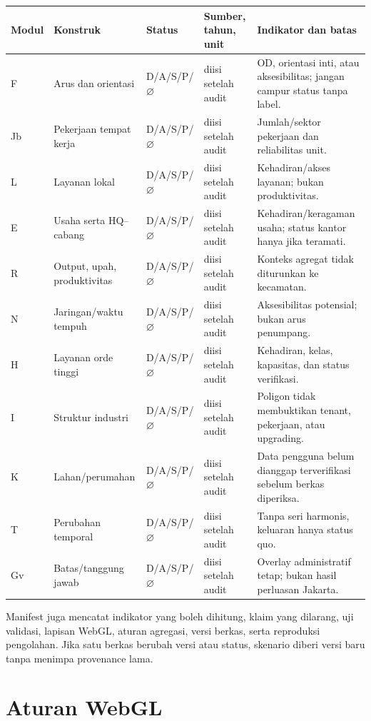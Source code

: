 \documentclass[10pt]{article}
\begin{document}
\begin{longtable}{@{}P{0.09\textwidth}P{0.18\textwidth}P{0.12\textwidth}P{0.18\textwidth}P{0.29\textwidth}@{}}
\toprule
Modul & Konstruk & Status & Sumber, tahun, unit & Indikator dan batas \\
\midrule
F & Arus dan orientasi & D/A/S/P/$\varnothing$ & diisi setelah audit & OD, orientasi inti, atau aksesibilitas; jangan campur status tanpa label. \\
Jb & Pekerjaan tempat kerja & D/A/S/P/$\varnothing$ & diisi setelah audit & Jumlah/sektor pekerjaan dan reliabilitas unit. \\
L & Layanan lokal & D/A/S/P/$\varnothing$ & diisi setelah audit & Kehadiran/akses layanan; bukan produktivitas. \\
E & Usaha serta HQ--cabang & D/A/S/P/$\varnothing$ & diisi setelah audit & Kehadiran/keragaman usaha; status kantor hanya jika teramati. \\
R & Output, upah, produktivitas & D/A/S/P/$\varnothing$ & diisi setelah audit & Konteks agregat tidak diturunkan ke kecamatan. \\
N & Jaringan/waktu tempuh & D/A/S/P/$\varnothing$ & diisi setelah audit & Aksesibilitas potensial; bukan arus penumpang. \\
H & Layanan orde tinggi & D/A/S/P/$\varnothing$ & diisi setelah audit & Kehadiran, kelas, kapasitas, dan status verifikasi. \\
I & Struktur industri & D/A/S/P/$\varnothing$ & diisi setelah audit & Poligon tidak membuktikan tenant, pekerjaan, atau upgrading. \\
K & Lahan/perumahan & D/A/S/P/$\varnothing$ & diisi setelah audit & Data pengguna belum dianggap terverifikasi sebelum berkas diperiksa. \\
T & Perubahan temporal & D/A/S/P/$\varnothing$ & diisi setelah audit & Tanpa seri harmonis, keluaran hanya status quo. \\
Gv & Batas/tanggung jawab & D/A/S/P/$\varnothing$ & diisi setelah audit & Overlay administratif tetap; bukan hasil perluasan Jakarta. \\
\bottomrule
\end{longtable}

Manifest juga mencatat indikator yang boleh dihitung, klaim yang dilarang, uji validasi, lapisan WebGL, aturan agregasi, versi berkas, serta reproduksi pengolahan. Jika satu berkas berubah versi atau status, skenario diberi versi baru tanpa menimpa provenance lama.

\section{Aturan WebGL}
\end{document}
